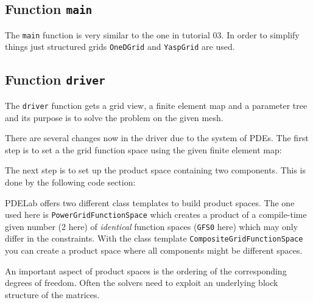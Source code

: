 \documentclass[a4paper,12pt]{article}
\begin{document}
\subsection{Function \lstinline{main}}

The \lstinline{main} function is very similar to the one in tutorial 03.
In order to simplify things just structured grids \lstinline{OneDGrid}
and \lstinline{YaspGrid} are used.

\subsection{Function \lstinline{driver}}

The \lstinline{driver} function gets a grid view, a finite element
map and a parameter tree and its purpose is to solve the problem on
the given mesh.


There are several changes now in the driver due to the system of PDEs.
The first step is to set a the grid function space using the given finite
element map:


The next step is to set up the product space containing
two components. This is done by the following code section:

PDELab offers two different class templates to build product spaces. The
one used here is \lstinline{PowerGridFunctionSpace} which creates
a product of a compile-time given number (2 here)
of \textit{identical} function spaces (\lstinline{GFS0} here)
which may only differ in the constraints. With the
class template \lstinline{CompositeGridFunctionSpace} you can create
a product space where all components might be different spaces.

An important aspect of product spaces is the ordering of the corresponding degrees
of freedom. Often the solvers need to exploit an underlying block structure
of the matrices.
\end{document}
